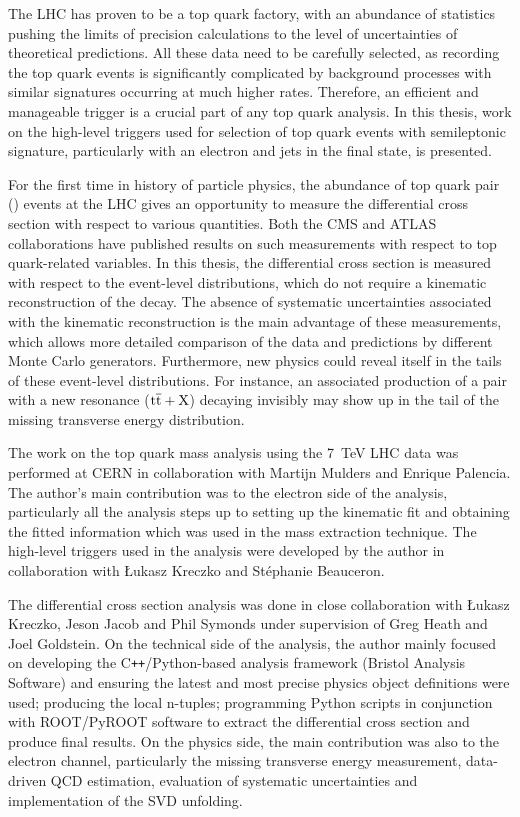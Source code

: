 The LHC has proven to be a top quark factory, with an abundance of statistics pushing the limits of precision
calculations to the level of uncertainties of theoretical predictions. All these data need to be carefully selected, as
recording the top quark events is significantly complicated by background processes with similar signatures occurring at
much higher rates. Therefore, an efficient and manageable trigger is a crucial part of any top quark analysis. In this
thesis, work on the high-level triggers used for selection of top quark events with semileptonic signature, particularly
with an electron and jets in the final state, is presented.

For the first time in history of particle physics, the abundance of top quark pair (\ttbar) events at the LHC gives an
opportunity to measure the \ttbar differential cross section with respect to various quantities. Both the CMS and ATLAS
collaborations have published results on such measurements with respect to top quark-related variables. In this thesis,
the \ttbar differential cross section is measured with respect to the event-level distributions, which do not require a
kinematic reconstruction of the \ttbar decay. The absence of systematic uncertainties associated with the kinematic
reconstruction is the main advantage of these measurements, which allows more detailed comparison of the data and
predictions by different Monte Carlo generators. Furthermore, new physics could reveal itself in the tails of these
event-level distributions. For instance, an associated production of a \ttbar pair with a new resonance
($\mathrm{t}\overline{\mathrm{t}}+\mathrm{X}$) decaying invisibly may show up in the tail of the missing transverse energy distribution.

The work on the top quark mass analysis using the \SI{7}{\TeV} LHC data was performed at CERN in collaboration with
Martijn Mulders and Enrique Palencia. The author's main contribution was to the electron side of the analysis,
particularly all the analysis steps up to setting up the kinematic fit and obtaining the fitted information which was
used in the mass extraction technique. The high-level triggers used in the analysis were developed by the author in
collaboration with \L{}ukasz Kreczko and St\'{e}phanie Beauceron.

The differential cross section analysis was done in close collaboration with \L{}ukasz Kreczko, Jeson Jacob and Phil
Symonds under supervision of Greg Heath and Joel Goldstein. On the technical side of the analysis, the author mainly
focused on developing the C\texttt{++}/Python-based analysis framework (Bristol Analysis Software) and ensuring the
latest and most precise physics object definitions were used; producing the local n-tuples; programming Python scripts
in conjunction with ROOT/PyROOT software to extract the differential cross section and produce final results. On the
physics side, the main contribution was also to the electron channel, particularly the missing transverse energy
measurement, data-driven QCD estimation, evaluation of systematic uncertainties and implementation of the SVD unfolding.

